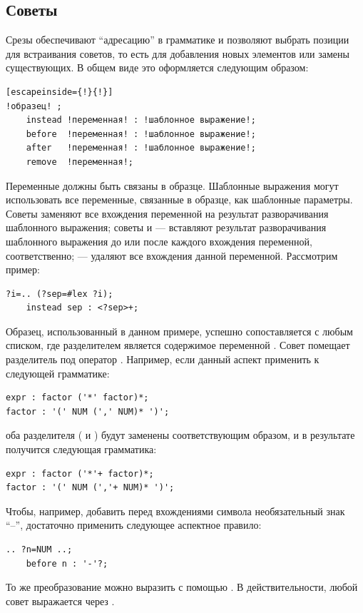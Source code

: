 \subsection{Советы}

Срезы обеспечивают ``адресацию'' в грамматике и позволяют выбрать позиции для встраивания советов, то есть для добавления новых элементов или замены существующих. В общем виде это оформляется следующим образом:
\begin{lstlisting}[escapeinside={!}{!}]
!образец! ;
	instead !переменная! : !шаблонное выражение!;
	before  !переменная! : !шаблонное выражение!;
	after   !переменная! : !шаблонное выражение!;
	remove  !переменная!;
\end{lstlisting}
Переменные должны быть связаны в образце. Шаблонные выражения могут использовать все переменные, связанные в образце, как шаблонные параметры. Советы  заменяют все вхождения переменной на результат разворачивания шаблонного выражения; советы  и  --- вставляют результат разворачивания шаблонного выражения до или после каждого вхождения переменной, соответственно;  --- удаляют все вхождения данной переменной. Рассмотрим пример:
\begin{lstlisting}
?i=.. (?sep=#lex ?i);
	instead sep : <?sep>+;
\end{lstlisting}
Образец, использованный в данном примере, успешно сопоставляется с любым списком, где разделителем является содержимое переменной . Совет  помещает разделитель под оператор \code{+}. Например, если данный аспект применить к следующей грамматике:
\begin{lstlisting}
expr : factor ('*' factor)*;
factor : '(' NUM (',' NUM)* ')';
\end{lstlisting}
оба разделителя (\code{*} и \code{,}) будут заменены соответствующим образом, и в результате получится следующая грамматика:
\begin{lstlisting}
expr : factor ('*'+ factor)*;
factor : '(' NUM (','+ NUM)* ')';
\end{lstlisting}

Чтобы, например, добавить перед вхождениями символа  необязательный знак ``--'', достаточно применить следующее аспектное правило:
\begin{lstlisting}
.. ?n=NUM ..;
	before n : '-'?;
\end{lstlisting}
То же преобразование можно выразить с помощью . В действительности, любой совет выражается через .

